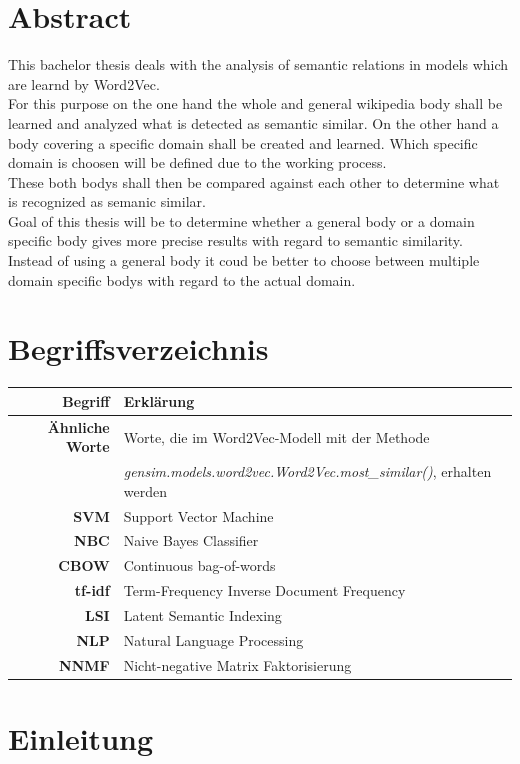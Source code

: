 \documentclass[12pt,a4paper]{report}
\begin{document}
\chapter*{Abstract}
This bachelor thesis deals with the analysis of semantic relations in models which are learnd by Word2Vec.\\
For this purpose on the one hand the whole and general wikipedia body shall be learned and analyzed what is detected as semantic similar. On the other hand a body covering a specific domain shall be created and learned. Which specific domain is choosen will be defined due to the working process.\\
These both bodys shall then be compared against each other to determine what is recognized as semanic similar.\\
Goal of this thesis will be to determine whether a general body or a domain specific body gives more precise results with regard to semantic similarity. Instead of using a general body it coud be better to choose between multiple domain specific bodys with regard to the actual domain.

\newpage
\tableofcontents
\newpage
\chapter*{Begriffsverzeichnis}
	\begin{tabular}{r|l}	
	\textbf{Begriff} & Erklärung\\
	\hline	
	\textbf{Ähnliche Worte} & Worte, die im Word2Vec-Modell mit der Methode\\
	&  \textit{gensim.models.word2vec.Word2Vec.most\_similar()}, erhalten werden\\
	\textbf{SVM} & Support Vector Machine\\
	\textbf{NBC} & Naive Bayes Classifier\\
	\textbf{CBOW} & Continuous bag-of-words\\
	\textbf{tf-idf} & Term-Frequency Inverse Document Frequency\\
	\textbf{LSI} & Latent Semantic Indexing\\
	\textbf{NLP} & Natural Language Processing\\
	\textbf{NNMF} & Nicht-negative Matrix Faktorisierung
	

\end{tabular}
\newpage
{}
\chapter{Einleitung}
\end{document}
